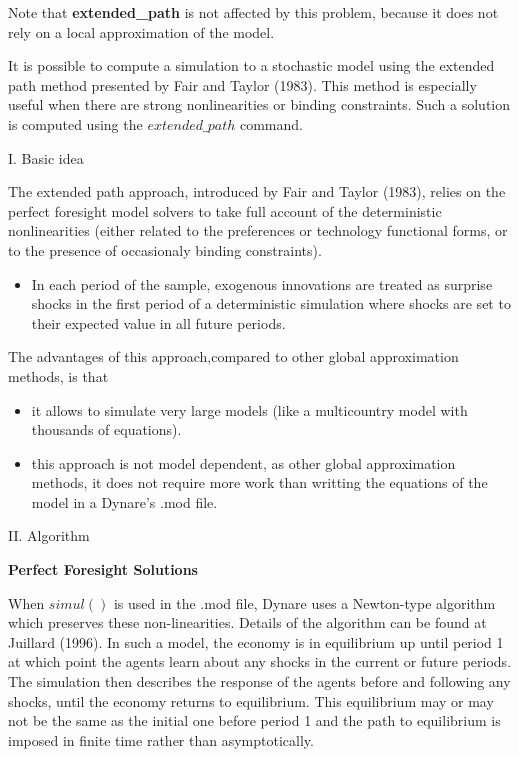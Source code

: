 \documentclass[10pt,math=newtx,citestyle=gb7714-2015,bibstyle=gb7714-2015]{elegantbook}
\begin{document}
{Note that \textbf{extended\_path} is not affected by this problem, because it does not rely on a local approximation of the model.

It is possible to compute a simulation to a stochastic model using the extended path method presented by Fair and Taylor (1983). This method is especially useful when there are strong nonlinearities or binding constraints. Such a solution is computed using the $extended\_path$ command.

I. Basic idea

The extended path approach, introduced by Fair and Taylor (1983), relies on the perfect foresight model solvers to take full account of the deterministic nonlinearities (either related to the preferences or technology functional forms, or to the presence of occasionaly binding constraints).

\begin{itemize}
	\item In each period of the sample, exogenous innovations are treated as surprise shocks in the first period of a deterministic simulation where shocks are set to their expected value in all future periods.
\end{itemize}

The advantages of this approach,compared to other global approximation methods, is that

\begin{itemize}
	\item it allows to simulate very large models (like a multicountry model with thousands of equations).
	\item this approach is not model dependent, as other global approximation methods, it does not require more work than writting the equations of the model in a Dynare’s .mod file.
\end{itemize}

II. Algorithm

\textbf{Perfect Foresight Solutions}

When $simul()$ is used in the .mod file, Dynare uses a Newton-type algorithm which preserves these non-linearities. Details of the algorithm can be found at Juillard (1996). In such a model, the economy is in equilibrium up until period 1 at which point the agents learn about any shocks in the current or
future periods. The simulation then describes the response of the agents before and following any shocks, until the economy returns to equilibrium. This equilibrium may or may not be the same as the initial one before period 1 and the path to equilibrium is imposed in finite time rather than asymptotically.

}
\end{document}

